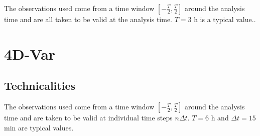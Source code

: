 \documentclass{report}
\begin{document}
The observations used come from a time window $\left[-\frac{T}{2}, \frac{T}{2}\right]$ around the analysis time and are all taken to be valid at the analysis time. $T = 3$ h is a typical value..

\chapter{4D-Var}
\label{chap:4d-var}
%

\section{Technicalities}
\label{sec:technicalities_4d-var}

The observations used come from a time window $\left[-\frac{T}{2}, \frac{T}{2}\right]$ around the analysis time and are taken to be valid at individual time steps $n\Delta t$. $T = 6$ h and $\Delta t = 15$ min are typical values.

\appendix

\printbibliography
\end{document}
